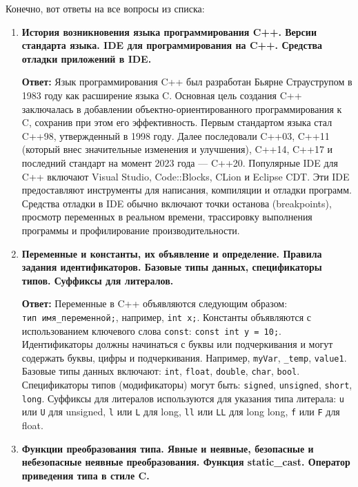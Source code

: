 \documentclass[
]{article}
\author{}
\date{}
\begin{document}
Конечно, вот ответы на все вопросы из списка:

\begin{enumerate}
\def\labelenumi{\arabic{enumi}.}
\item
  \textbf{История возникновения языка программирования C++. Версии
  стандарта языка. IDE для программирования на C++. Средства отладки
  приложений в IDE.}

  \textbf{Ответ:} Язык программирования C++ был разработан Бьярне
  Страуструпом в 1983 году как расширение языка C. Основная цель
  создания C++ заключалась в добавлении объектно-ориентированного
  программирования к C, сохранив при этом его эффективность. Первым
  стандартом языка стал C++98, утвержденный в 1998 году. Далее
  последовали C++03, C++11 (который внес значительные изменения и
  улучшения), C++14, C++17 и последний стандарт на момент 2023 года ---
  C++20. Популярные IDE для C++ включают Visual Studio, Code::Blocks,
  CLion и Eclipse CDT. Эти IDE предоставляют инструменты для написания,
  компиляции и отладки программ. Средства отладки в IDE обычно включают
  точки останова (breakpoints), просмотр переменных в реальном времени,
  трассировку выполнения программы и профилирование производительности.
\item
  \textbf{Переменные и константы, их объявление и определение. Правила
  задания идентификаторов. Базовые типы данных, спецификаторы типов.
  Суффиксы для литералов.}

  \textbf{Ответ:} Переменные в C++ объявляются следующим образом:
  \texttt{тип\ имя\_переменной;}, например, \texttt{int\ x;}. Константы
  объявляются с использованием ключевого слова \texttt{const}:
  \texttt{const\ int\ y\ =\ 10;}. Идентификаторы должны начинаться с
  буквы или подчеркивания и могут содержать буквы, цифры и
  подчеркивания. Например, \texttt{myVar}, \texttt{\_temp},
  \texttt{value1}. Базовые типы данных включают: \texttt{int},
  \texttt{float}, \texttt{double}, \texttt{char}, \texttt{bool}.
  Спецификаторы типов (модификаторы) могут быть: \texttt{signed},
  \texttt{unsigned}, \texttt{short}, \texttt{long}. Суффиксы для
  литералов используются для указания типа литерала: \texttt{u} или
  \texttt{U} для unsigned, \texttt{l} или \texttt{L} для long,
  \texttt{ll} или \texttt{LL} для long long, \texttt{f} или \texttt{F}
  для float.
\item
  \textbf{Функции преобразования типа. Явные и неявные, безопасные и
  небезопасные неявные преобразования. Функция static\_cast. Оператор
  приведения типа в стиле C.}


\end{enumerate}
\end{document}
